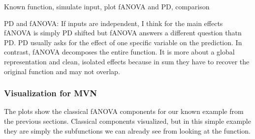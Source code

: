 Known function, simulate input, plot fANOVA and PD, comparison

PD and fANOVA: If inputs are independent, I think for the main effects fANOVA is simply PD shifted but fANOVA answers a different question thatn PD. PD usually asks for the effect of one specific variable on the prediction. In contrast, fANOVA decomposes the entire function. It is more about a global representation and clean, isolated effects because in sum they have to recover the original function and may not overlap.

\subsubsection*{Visualization for MVN}

The plots show the classical fANOVA components for our known example from the previous sections. Classical components visualized, but in this simple example they are simply the subfunctions we can already see from looking at the function.

